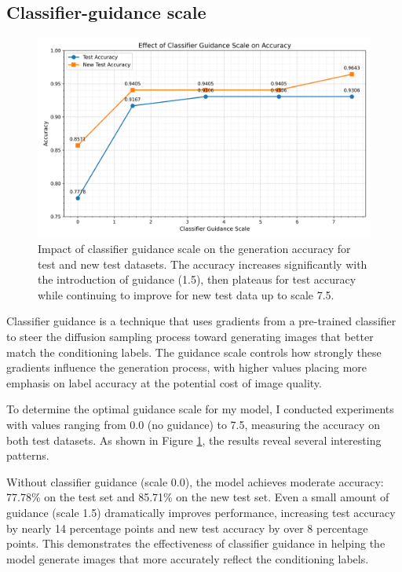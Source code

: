 \documentclass[a4paper,twocolumn]{article}
\begin{document}
\subsection{Classifier-guidance scale}
\label{sec:gs}
\begin{figure}[H]
\centering
\includegraphics[width=0.95\linewidth]{figures/guidance_scale_accuracy}
\caption{Impact of classifier guidance scale on the generation accuracy for test and new test datasets. The accuracy increases significantly with the introduction of guidance (1.5), then plateaus for test accuracy while continuing to improve for new test data up to scale 7.5.}
\label{fig:guidancescaleaccuracy}
\end{figure}

Classifier guidance is a technique that uses gradients from a pre-trained classifier to steer the diffusion sampling process toward generating images that better match the conditioning labels. The guidance scale controls how strongly these gradients influence the generation process, with higher values placing more emphasis on label accuracy at the potential cost of image quality.

To determine the optimal guidance scale for my model, I conducted experiments with values ranging from 0.0 (no guidance) to 7.5, measuring the accuracy on both test datasets. As shown in Figure \ref{fig:guidancescaleaccuracy}, the results reveal several interesting patterns.

Without classifier guidance (scale 0.0), the model achieves moderate accuracy: 77.78\% on the test set and 85.71\% on the new test set. Even a small amount of guidance (scale 1.5) dramatically improves performance, increasing test accuracy by nearly 14 percentage points and new test accuracy by over 8 percentage points. This demonstrates the effectiveness of classifier guidance in helping the model generate images that more accurately reflect the conditioning labels.
\end{document}

